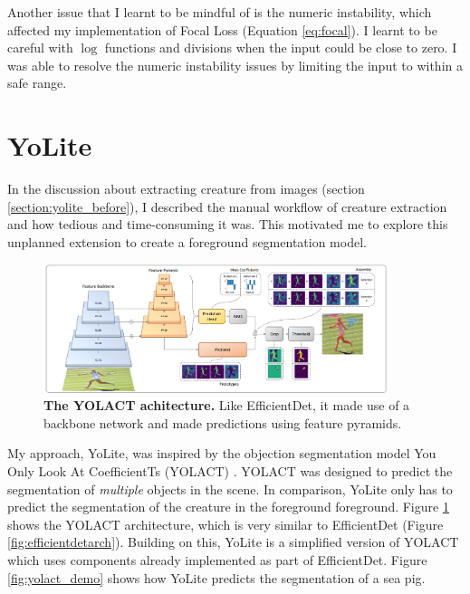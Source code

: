 \documentclass[12pt,a4paper,twoside,openany]{report}
\begin{document}
Another issue that I learnt to be mindful of is the numeric instability, which affected my implementation of Focal Loss (Equation \ref{eq:focal}). I learnt to be careful with $\log$ functions and divisions when the input could be close to zero. I was able to resolve the numeric instability issues by limiting the input to within a safe range.

\section{YoLite} \label{section:yolite}
In the discussion about extracting creature from images (section \ref{section:yolite_before}), I described the manual workflow of creature extraction and how tedious and time-consuming it was. This motivated me to explore this unplanned extension to create a foreground segmentation model.

\begin{figure}[H]
    \centering
    \includegraphics[width=0.9\textwidth]{figs/implementation/yolact/architecture.png}
    \caption{\textbf{The YOLACT \cite{bolya_yolact_2019} achitecture.} Like EfficientDet, it made use of a backbone network and made predictions using feature pyramids.} 
    \label{fig:yolact_arch}
\end{figure}

My approach, YoLite, was inspired by the objection segmentation model You Only Look At CoefficientTs (YOLACT) \cite{bolya_yolact_2019}. YOLACT was designed to predict the segmentation of \textit{multiple} objects in the scene. In comparison, YoLite only has to predict the segmentation of the creature in the foreground foreground. Figure \ref{fig:yolact_arch} shows the YOLACT architecture, which is very similar to EfficientDet (Figure \ref{fig:efficientdetarch}). Building on this, YoLite is a simplified version of YOLACT which uses components already implemented as part of EfficientDet. Figure \ref{fig:yolact_demo} shows how YoLite predicts the segmentation of a sea pig.
\end{document}
